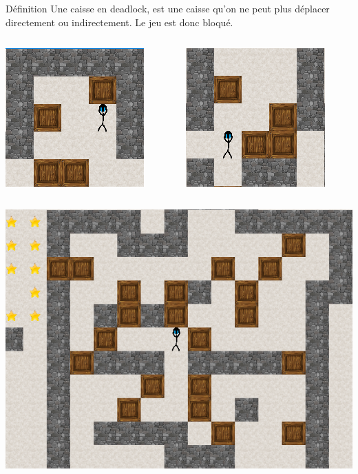 \documentclass{beamer}
\begin{document}
\begin{frame}

\begin{block}{Définition}
Une caisse en deadlock, est une caisse qu'on ne peut plus déplacer directement ou indirectement. Le jeu est donc bloqué.
\end{block}
\vspace{0.5cm}
\begin{center}
\begin{columns}
\begin{column}{4cm}
\includegraphics[scale=0.7]{images/deadlock1.PNG}
\end{column}
\begin{column}{4cm}
\includegraphics[scale=0.7]{images/deadlock2.PNG}
\end{column}
\end{columns}
\end{center}
\end{frame}

\begin{frame}
\begin{center}
\includegraphics[scale=0.65]{images/deadlock3.PNG}
\end{center}
\end{frame}
\end{document}
